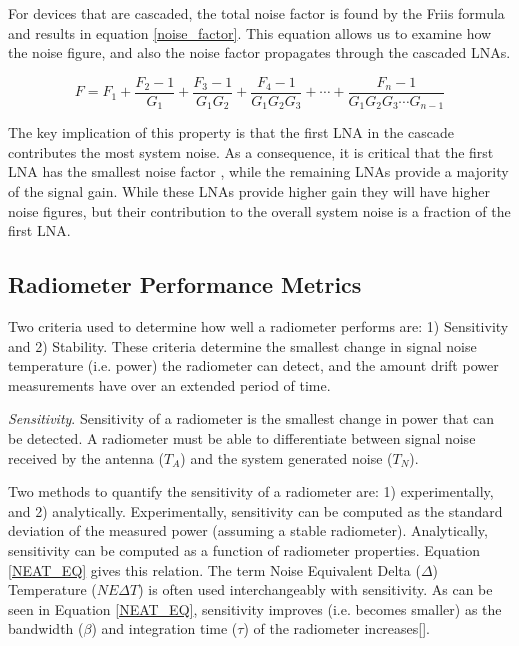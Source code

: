 For devices that are cascaded, the total noise factor is found by the Friis formula and results in equation \ref{noise_factor}.  This equation allows us to examine how the noise figure, and also the noise factor propagates through the cascaded LNAs.  

\begin{equation}\label{noise_factor}
F=F_1+\frac{F_2-1}{G_1}+\frac{F_3-1}{G_1 G_2}+\frac{F_4-1}{G_1 G_2 G_3}+\cdots +\frac{F_n-1}{G_1 G_2 G_3 \cdots G_{n-1}}
\end{equation}

The key implication of this property is that the first LNA in the cascade contributes the most system noise.  As a consequence, it is critical that the first LNA has the smallest noise factor , while the remaining LNAs provide a majority of the signal gain.  While these LNAs provide higher gain they will have higher noise figures, but their contribution to the overall system noise is a fraction of the first LNA.

\subsection{Radiometer Performance Metrics}\label{performance_metrics}

Two criteria used to determine how well a radiometer performs are: 1) Sensitivity and 2) Stability.  These criteria determine the smallest change in signal noise temperature (i.e. power) the radiometer can detect, and the amount drift power measurements have over an extended period of time.

\emph{Sensitivity}.  Sensitivity of a radiometer is the smallest change in power that can be detected.  A radiometer must be able to differentiate between signal noise received by  the antenna ($T_{A}$) and the system generated noise ($T_N$).

Two methods to quantify the sensitivity of a radiometer are: 1) experimentally, and 2) analytically.  Experimentally, sensitivity can be computed as the standard deviation of the measured power (assuming a stable radiometer).  Analytically, sensitivity can be computed as a function of radiometer properties.  Equation \ref{NEAT_EQ} gives this relation.  The term Noise Equivalent Delta ($\Delta$) Temperature ($NE\Delta T$) is often used interchangeably with sensitivity.  As can be seen in Equation \ref{NEAT_EQ}, sensitivity improves (i.e. becomes smaller) as the bandwidth ($\beta$) and integration time ($\tau$) of the radiometer increases[\cite{ulaby}].

